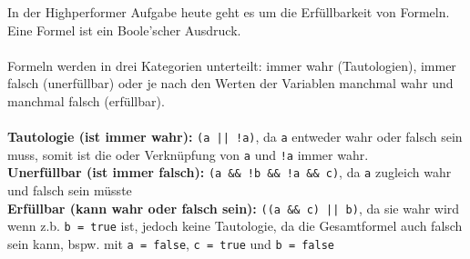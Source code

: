 

In der Highperformer Aufgabe heute geht es um die Erfüllbarkeit von Formeln. Eine Formel ist ein Boole'scher Ausdruck.
\\\\
Formeln werden in drei Kategorien unterteilt: immer wahr (Tautologien), immer falsch (unerfüllbar) oder je nach den Werten der Variablen manchmal wahr und manchmal falsch (erfüllbar).
\\\\
\textbf{Tautologie (ist immer wahr): } \texttt{(a || !a)}, da \texttt{a} entweder wahr oder falsch sein muss, somit ist die oder Verknüpfung von \texttt{a} und \texttt{!a} immer wahr.\\
\textbf{Unerfüllbar (ist immer falsch): } \texttt{(a \&\& !b \&\& !a \&\& c)}, da \texttt{a} zugleich wahr und falsch sein müsste\\
\textbf{Erfüllbar (kann wahr oder falsch sein): } \texttt{((a \&\& c) || b)}, da sie wahr wird wenn z.b. \texttt{b = true} ist, jedoch keine Tautologie, da die Gesamtformel auch falsch sein kann, bspw. mit \texttt{a = false}, \texttt{c = true} und \texttt{b = false}

